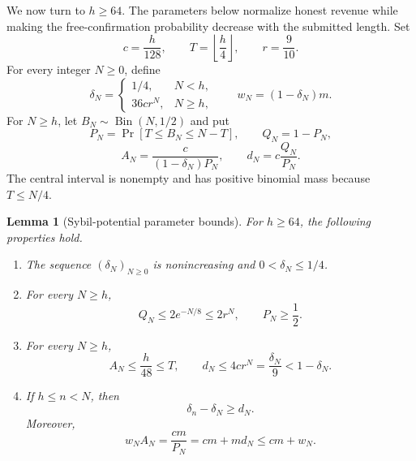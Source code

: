 \documentclass[11pt]{article}
\newtheorem{lemma}{Lemma}[section]
\begin{document}
We now turn to $h\ge64$.  The parameters below normalize honest revenue while
making the free-confirmation probability decrease with the submitted length.
Set
\begin{equation}
c=\frac{h}{128},
\qquad
T=\left\lfloor\frac h4\right\rfloor,
\qquad
r=\frac9{10}.
\label{eq:large-base-parameters}
\end{equation}
For every integer $N\ge0$, define
\begin{equation}
\delta_N=
\begin{cases}
1/4,&N<h,\\
36cr^N,&N\ge h,
\end{cases}
\qquad
w_N=(1-\delta_N)m.
\label{eq:potential-parameters}
\end{equation}
For $N\ge h$, let $B_N\sim\operatorname{Bin}(N,1/2)$ and put
\begin{equation}
P_N=\Pr[T\le B_N\le N-T],
\qquad
Q_N=1-P_N,
\label{eq:central-probability}
\end{equation}
\begin{equation}
A_N=\frac{c}{(1-\delta_N)P_N},
\qquad
d_N=c\frac{Q_N}{P_N}.
\label{eq:normalization-parameters}
\end{equation}
The central interval is nonempty and has positive binomial mass because
$T\le N/4$.

\begin{lemma}[Sybil-potential parameter bounds]
\label{lem:parameter-bounds}
For $h\ge64$, the following properties hold.
\begin{enumerate}
  \item The sequence $(\delta_N)_{N\ge0}$ is nonincreasing and
  $0<\delta_N\le1/4$.
  \item For every $N\ge h$,
  \[
  Q_N\le2e^{-N/8}\le2r^N,
  \qquad
  P_N\ge\frac12.
  \]
  \item For every $N\ge h$,
  \[
  A_N\le\frac h{48}\le T,
  \qquad
  d_N\le4cr^N=\frac{\delta_N}{9}<1-\delta_N.
  \]
  \item If $h\le n<N$, then
  \begin{equation}
  \delta_n-\delta_N\ge d_N.
  \label{eq:potential-drop}
  \end{equation}
  Moreover,
  \begin{equation}
  w_NA_N=\frac{cm}{P_N}=cm+md_N\le cm+w_N.
  \label{eq:maximum-revenue}
  \end{equation}
\end{enumerate}
\end{lemma}
\end{document}
